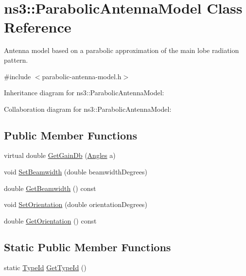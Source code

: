 \hypertarget{classns3_1_1ParabolicAntennaModel}{}\section{ns3\+:\+:Parabolic\+Antenna\+Model Class Reference}
\label{classns3_1_1ParabolicAntennaModel}


Antenna model based on a parabolic approximation of the main lobe radiation pattern.  




{\ttfamily \#include $<$parabolic-\/antenna-\/model.\+h$>$}



Inheritance diagram for ns3\+:\+:Parabolic\+Antenna\+Model\+:


Collaboration diagram for ns3\+:\+:Parabolic\+Antenna\+Model\+:
\subsection*{Public Member Functions}
\begin{DoxyCompactItemize}
\item 
virtual double \hyperlink{classns3_1_1ParabolicAntennaModel_a8481d1a6cdf22ed0afe9237588ab2ce1}{Get\+Gain\+Db} (\hyperlink{structns3_1_1Angles}{Angles} a)
\item 
void \hyperlink{classns3_1_1ParabolicAntennaModel_a1cf15e22d077ff6957c7f9c0f4cdc5a5}{Set\+Beamwidth} (double beamwidth\+Degrees)
\item 
double \hyperlink{classns3_1_1ParabolicAntennaModel_a2b381ba5c53212a66021dd4e54c32cc4}{Get\+Beamwidth} () const 
\item 
void \hyperlink{classns3_1_1ParabolicAntennaModel_a9a1c122ef8b11f2b677a77fbd6535a93}{Set\+Orientation} (double orientation\+Degrees)
\item 
double \hyperlink{classns3_1_1ParabolicAntennaModel_a47886db611d1a6f493b1a4cdcb22e727}{Get\+Orientation} () const 
\end{DoxyCompactItemize}
\subsection*{Static Public Member Functions}
\begin{DoxyCompactItemize}
\item 
static \hyperlink{classns3_1_1TypeId}{Type\+Id} \hyperlink{classns3_1_1ParabolicAntennaModel_a0d934cb882753be1dcaf09303fda25db}{Get\+Type\+Id} ()
\end{DoxyCompactItemize}
